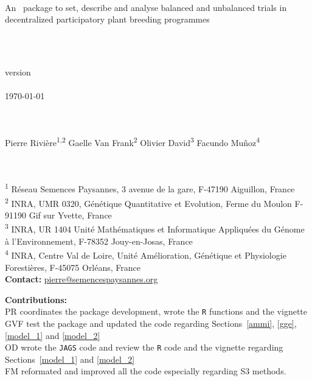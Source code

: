 \pagestyle{empty}
\begin{center}
\Huge{\pack } \\
\Large{An \R~package to set, describe and analyse balanced and unbalanced trials in decentralized participatory plant breeding programmes}

~\\


~\\

version \versionnumber \\

~\\
\today

~\\~\\

Pierre Rivi\`ere\textsuperscript{1,2} \hspace{.5cm} 
Gaelle Van Frank\textsuperscript{2} \hspace{.5cm}
Olivier David\textsuperscript{3}  \hspace{.5cm} 
Facundo Muñoz\textsuperscript{4}
\\
~\\~\\ 
\end{center}

\vfill

\noindent\textsuperscript{1} R\'eseau Semences Paysannes, 3 avenue de la gare, F-47190 Aiguillon, France \\
\textsuperscript{2} INRA, UMR 0320, Génétique Quantitative et Evolution, Ferme du Moulon F-91190 Gif sur Yvette, France \\
\textsuperscript{3} INRA, UR 1404 Unité Mathématiques et Informatique Appliquées du Génome à l'Environnement, F-78352 Jouy-en-Josas, France \\ 
\textsuperscript{4} INRA, Centre Val de Loire, Unité Amélioration, Génétique et Physiologie Forestières, F-45075 Orléans, France \\ 
\textbf{Contact:} \href{mailto:pierre@semencespaysannes.org}{pierre@semencespaysannes.org} \\

\vfill

\noindent\textbf{Contributions:} \\
PR coordinates the package development, wrote the \texttt{R} functions and the vignette \\
GVF test the package and updated the code regarding Sections~\ref{ammi}, \ref{gge}, \ref{model_1} and \ref{model_2} \\
OD wrote the \texttt{JAGS} code and review the \texttt{R} code and the vignette regarding Sections~\ref{model_1} and \ref{model_2} \\
FM reformated and improved all the code especially regarding S3 methods. \\

